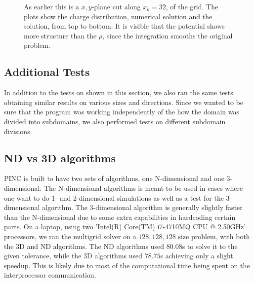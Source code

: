 \begin{figure}
\begin{subfigure}[b]{0.6\textwidth}
			\end{subfigure}
			\caption{As earlier this is a \(x,y\)-plane cut along \(x_k=32\), of the grid. The plots show the charge distribution,
			numerical solution and the solution, from top to bottom. It is visible that the potential shows more structure than
			the \(\rho\), since the integration smooths the original problem.}
			\label{fig:random}
		\end{figure}

	\subsection{Additional Tests}
		In addition to the tests on shown in this section, we also ran the same tests
		obtaining similar results on various sizes and directions. Since we wanted to be sure that the program
		was working independently of the how the domain was divided into subdomains, we also performed
		tests on different subdomain divisions.


	\subsection{ND vs 3D algorithms}
		PINC is built to have two sets of algorithms, one N-dimensional and one 3-dimensional.
		The N-dimensional algorithms is meant to be used in cases where one want to do 1- and 2-dimensional
		simulations as well as a test for the 3-dimensional algorithm. The 3-dimensional algorithm
		is generally slightly faster than the N-dimensional due to some extra capabilities in hardcoding
		certain parts. On a laptop, using two 'Intel(R) Core(TM) i7-4710MQ CPU @ 2.50GHz' processors, we
		ran the multigrid solver on a \(128,128,128\) size problem, with both the \(3\)D and ND algorithms.
 		The ND algorithms used \(80.08\)s to solve it to the given tolerance, while the \(3\)D algorithms
 		used \(78.75\)s achieving only a slight speedup. This is likely due to most of the
		computational time being spent on the interprocessor communication.
